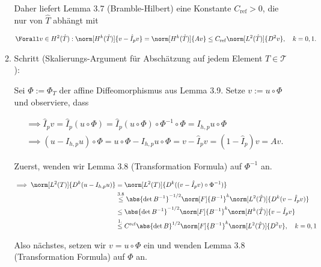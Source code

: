 \begin{solution}
\begin{enumerate}[label = \textbf{\alph*)}]
\begin{enumerate}[label = \arabic*.]
    Daher liefert Lemma 3.7 (Bramble-Hilbert) eine Konstante $C_\mathrm{ref} > 0$, die nur von $\hat T$ abhängt mit

    \begin{align*}
      \Forall v \in H^2(\hat T):
      \norm[H^k(\hat T)]{v - \hat I_p v}
      =
      \norm[H^k(\hat T)]{A v}
      \leq
      C_\mathrm{ref}
      \norm[L^2(\hat T)]{D^2 v},
      \quad
      k = 0, 1.
    \end{align*}

    \item Schritt (Skalierungs-Argument für Abschätzung auf jedem Element $T \in \mathcal{T}$):
    
    Sei $\Phi := \Phi_T$ der affine Diffeomorphismus aus Lemma 3.9.
    Setze $v := u \circ \Phi$ und observiere, dass

    \begin{align*}
      & \implies
      \hat I_p v
      =
      \hat I_p (u \circ \Phi)
      =
      \hat I_p (u \circ \Phi) \circ \Phi^{-1} \circ \Phi
      =
      I_{h, p} u \circ \Phi \\
      & \implies
      (u - I_{h, p} u) \circ \Phi
      =
      u \circ \Phi - I_{h, p} u \circ \Phi
      =
      v - \hat I_p v
      =
      (1 - \hat I_p) v
      =
      A v.
    \end{align*}

    Zuerst, wenden wir Lemma 3.8 (Transformation Formula) auf $\Phi^{-1}$ an.


    \begin{align*}
      \implies
      \norm[L^2(T)]{D^k (u - I_{h, p} u)}
      & =
      \norm[L^2(T)]{D^k ((v - \hat I_p v) \circ \Phi^{-1})} \\
      & \stackrel
      {
        \mathrm{3.8}
      }{\leq}
      \abs{\det B^{-1}}^{-1/2} \norm[F]{B^{-1}}^k \norm[L^2(\hat T)]{D^k (v - \hat I_p v)} \\
      & \leq
      \abs{\det B^{-1}}^{-1/2} \norm[F]{B^{-1}}^k \norm[H^k(\hat T)]{v - \hat I_p v} \\
      & \stackrel
      {
        \mathrm{1.}
      }{\leq}
      C^\mathrm{ref} \abs{\det B}^{1/2} \norm[F]{B^{-1}}^k \norm[L^2(\hat T)]{D^2 v},
      \quad
      k = 0, 1
    \end{align*}

    Also nächstes, setzen wir $v = u \circ \Phi$ ein und wenden Lemma 3.8 (Transformation Formula) auf $\Phi$ an.


\end{enumerate}
\end{enumerate}
\end{solution}
